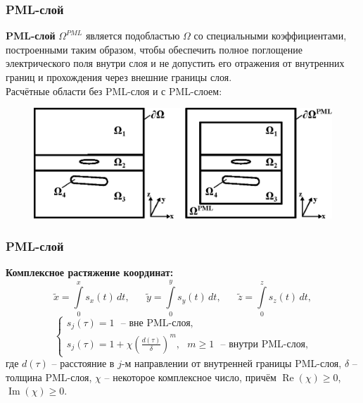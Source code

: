 \documentclass[aspectratio=43]{beamer}
\renewcommand{\Re}{\mathop{\mathrm{Re}}\nolimits}
\renewcommand{\Im}{\mathop{\mathrm{Im}}\nolimits}
\newcommand{\MakeTitle}[1]{\frametitle{\hspace{1.5em}\textbf{#1} \hfill \insertframenumber{} }}
\begin{document}

\begin{frame}
	\MakeTitle{PML-слой}
	\textbf{PML-слой} $\Omega^{PML}$ является подобластью $\Omega$ со специальными коэффициентами, построенными таким образом, чтобы обеспечить полное поглощение электрического поля внутри слоя и не допустить его отражения от внутренних границ и прохождения через внешние границы слоя.\\
	\vspace{0.5em}
	Расчётные области без PML-слоя и с PML-слоем:
	\vspace{-1.25em}
	\begin{figure}[H]
		\includegraphics[width=\textwidth,height=\textheight,keepaspectratio]{area_3layers_PML.eps}
	\end{figure}
\end{frame}


\begin{frame}
	\MakeTitle{PML-слой}
	\textbf{Комплексное растяжение координат:}
	\begin{equation*}
		\tilde{x} = \int\limits_0^x s_x (t) \,dt ,
		\text{~~~~~}
		\tilde{y} = \int\limits_0^y s_y (t) \,dt ,
		\text{~~~~~}
		\tilde{z} = \int\limits_0^z s_z (t) \,dt ,
	\end{equation*}
	\begin{equation*}
		\begin{cases}
		\displaystyle
		s_j(\tau) = 1 \text{~~--~вне PML-слоя,} \\
		\displaystyle
		s_j(\tau) = 1 + \chi \left( \frac{d(\tau)}{\delta} \right)^m , \text{~~} m \geq 1 \text{~~--~внутри PML-слоя,}
		\label{eq:pml_s}
		\end{cases}
	\end{equation*}
	где $d(\tau)$ -- расстояние в $j$-м направлении от внутренней границы PML-слоя, $\delta$ -- толщина PML-слоя, $\chi$ -- некоторое комплексное число, причём $\Re(\chi) \ge 0$, $\Im(\chi) \ge 0$.
\end{frame}
\end{document}
